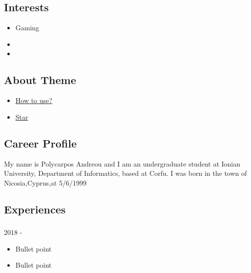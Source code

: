 \documentclass[english,]{article}
\providecommand{\tightlist}{%
  \setlength{\itemsep}{0pt}\setlength{\parskip}{0pt}}
\begin{document}
\hypertarget{interests}{%
\subsection{Interests}\label{interests}}

\begin{itemize}
\item
  Gaming
\item
\item
\end{itemize}

\hypertarget{about-theme}{%
\subsection{About Theme}\label{about-theme}}

\begin{itemize}
\tightlist
\item
  \href{https://www.youtube.com/watch?v=Jnmj1dXDbNk}{How to use?}
\item
  \href{https://github.com/sharu725/online-cv}{Star}
\end{itemize}

\hypertarget{career-profile}{%
\subsection{\texorpdfstring{{ \emph{} \emph{} } Career
Profile}{    Career Profile}}\label{career-profile}}

My name is Polycarpos Andreou and I am an undergraduate student at
Ionian University, Department of Informatics, based at Corfu. I was born
in the town of Nicosia,Cyprus,at 5/6/1999

\hypertarget{experiences}{%
\subsection{\texorpdfstring{{ \emph{} \emph{} }
Experiences}{    Experiences}}\label{experiences}}

\hypertarget{section-2}{%
\subsubsection{}\label{section-2}}

2018 -

\begin{itemize}
\tightlist
\item
  Bullet point
\item
  Bullet point
\end{itemize}
\end{document}
